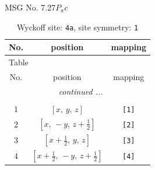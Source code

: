 \documentclass[fleqn,8pt]{jsarticle}
\begin{document}
\setcounter{MaxMatrixCols}{32}

\renewcommand{\tablename}{Table~}
\renewcommand{\figurename}{Figure~}
\begin{center}
\LARGE
MSG No. 7.27\quad$P_{a}c$
\end{center}
\renewcommand{\arraystretch}{1.2}
\begin{longtable}{ccc}
\caption{Wyckoff site: {\tt 4a}, site symmetry: {\tt 1}}
 \\
 \hline \hline
No. & position & mapping \\ \hline \endfirsthead

\multicolumn{2}{l}{\tablename\ \thetable{}} \\
 \hline \hline
No. & position & mapping \\ \hline \endhead

 \hline \hline
\multicolumn{2}{r}{\footnotesize\it continued ...} \\ \endfoot

 \hline \hline
\multicolumn{2}{r}{} \\ \endlastfoot

1 & $\left[ x,\, y,\, z \right]$ & {\tt [1]} \\ \hline
2 & $\left[ x,\, - y,\, z + \frac{1}{2} \right]$ & {\tt [2]} \\ \hline
3 & $\left[ x + \frac{1}{2},\, y,\, z \right]$ & {\tt [3]} \\ \hline
4 & $\left[ x + \frac{1}{2},\, - y,\, z + \frac{1}{2} \right]$ & {\tt [4]} \\
\end{longtable}
\end{document}
